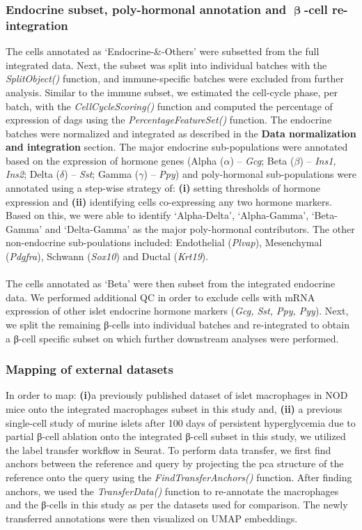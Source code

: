 \subsubsection{\large Endocrine subset, poly-hormonal annotation and \( \mathbf{\upbeta} \)-cell re-integration}
The cells annotated as `Endocrine-\&-Others' were subsetted from the full integrated data. Next, the subset was split into individual batches with the \textit{SplitObject()} function, and immune-specific batches were excluded from further analysis. Similar to the immune subset, we estimated the cell-cycle phase, per batch, with the \textit{CellCycleScoring()} function and computed the percentage of expression of \glspl{dag} using the  \textit{PercentageFeatureSet()} function. The endocrine batches were normalized and integrated as described in the \textbf{Data normalization and integration} section. The major endocrine sub-populations were annotated based on the expression of hormone genes (Alpha ($\alpha$) – \textit{Gcg}; Beta ($\beta$) – \textit{Ins1, Ins2}; Delta ($\delta$) – \textit{Sst}; Gamma ($\gamma$) – \textit{Ppy}) and poly-hormonal sub-populations were annotated using a step-wise strategy of: \textbf{(i)} setting thresholds of hormone expression and \textbf{(ii)} identifying cells co-expressing any two hormone markers. Based on this, we were able to identify ‘Alpha-Delta’, ‘Alpha-Gamma’, ‘Beta-Gamma’ and ‘Delta-Gamma’ as the major poly-hormonal contributors. The other non-endocrine sub-poulations included: Endothelial (\textit{Plvap}), Mesenchymal (\textit{Pdgfra}), Schwann (\textit{Sox10}) and Ductal (\textit{Krt19}).\\\\The cells annotated as ‘Beta’ were then subset from the integrated endocrine data. We performed additional QC in order to exclude cells with mRNA expression of other islet endocrine hormone markers (\textit{Gcg, Sst, Ppy, Pyy}). Next, we split the remaining β-cells into individual batches and re-integrated to obtain a β-cell specific subset on which further downstream analyses were performed.   


\subsubsection{\large Mapping of external datasets}
In order to map: \textbf{(i)}a previously published dataset of islet macrophages in NOD mice \textbf{\cite{zakharov_single-cell_2020}} onto the integrated macrophages subset in this study and, \textbf{(ii)} a previous single-cell study of murine islets after 100 days of persistent hyperglycemia due to partial β-cell ablation \textbf{\cite{sachs_targeted_2020}} onto the integrated β-cell subset in this study, we utilized the label transfer workflow in Seurat. To perform data transfer, we first find anchors between the reference and query by projecting the \gls{pca} structure of the reference onto the query using the \textit{FindTransferAnchors()} function. After finding anchors, we used the \textit{TransferData()} function to re-annotate the macrophages and the β-cells in this study as per the datasets used for comparison. The newly transferred annotations were then visualized on UMAP embeddings. 


